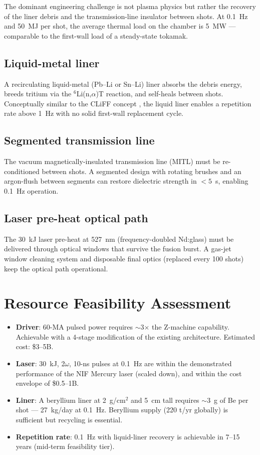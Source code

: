 \documentclass[11pt]{article}
\begin{document}
The dominant engineering challenge is not plasma physics but rather
the recovery of the liner debris and the transmission-line insulator
between shots. At 0.1~Hz and 50~MJ per shot, the average thermal load
on the chamber is 5~MW --- comparable to the first-wall load of a
steady-state tokamak.

\subsection{Liquid-metal liner}
A recirculating liquid-metal (Pb--Li or Sn--Li) liner absorbs the
debris energy, breeds tritium via the $^6$Li(n,$\alpha$)T reaction,
and self-heals between shots. Conceptually similar to the CLiFF concept
\cite{meyer2018}, the liquid liner enables a repetition rate above
1~Hz with no solid first-wall replacement cycle.

\subsection{Segmented transmission line}
The vacuum magnetically-insulated transmission line (MITL) must be
re-conditioned between shots. A segmented design with rotating
brushes and an argon-flush between segments can restore dielectric
strength in $<5$~s, enabling 0.1~Hz operation.

\subsection{Laser pre-heat optical path}
The 30~kJ laser pre-heat at 527~nm (frequency-doubled Nd:glass) must
be delivered through optical windows that survive the fusion burst.
A gas-jet window cleaning system and disposable final optics (replaced
every 100 shots) keep the optical path operational.

\section{Resource Feasibility Assessment}

\begin{itemize}
\item \textbf{Driver}: 60-MA pulsed power requires $\sim$3$\times$ the
Z-machine capability. Achievable with a 4-stage modification of the
existing architecture. Estimated cost: \$3--5B.
\item \textbf{Laser}: 30~kJ, 2$\omega$, 10-ns pulses at 0.1~Hz are
within the demonstrated performance of the NIF Mercury laser (scaled
down), and within the cost envelope of \$0.5--1B.
\item \textbf{Liner}: A beryllium liner at 2~g/cm$^2$ and 5~cm tall
requires $\sim$3~g of Be per shot --- 27~kg/day at 0.1~Hz. Beryllium
supply (220 t/yr globally) is sufficient but recycling is essential.
\item \textbf{Repetition rate}: 0.1~Hz with liquid-liner recovery is
achievable in 7--15 years (mid-term feasibility tier).
\end{itemize}
\end{document}
